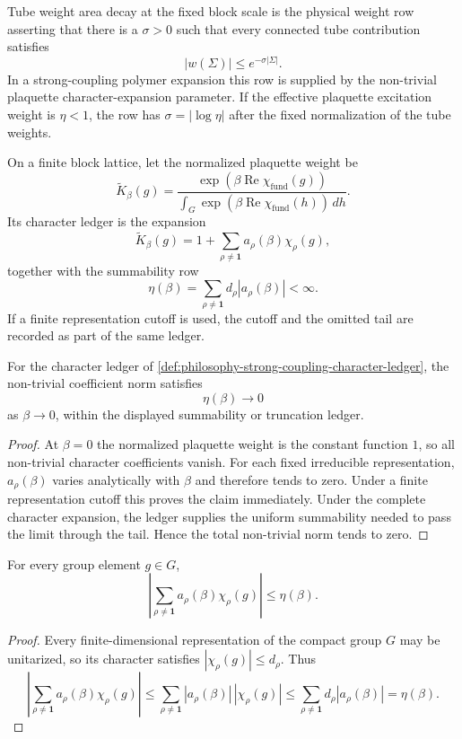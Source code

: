 \begin{definition}
\label{def:philosophy-tube-weight-area-decay}
Tube weight area decay at the fixed block scale is the physical weight
row asserting that there is a $\sigma>0$ such that every connected
tube contribution satisfies
$$
|w(\Sigma)|\le e^{-\sigma|\Sigma|}.
$$
In a strong-coupling polymer expansion this row is supplied by the
non-trivial plaquette character-expansion parameter. If the effective
plaquette excitation weight is $\eta<1$, the row has
$\sigma=|\log\eta|$ after the fixed normalization of the tube weights.
\end{definition}

\begin{definition}
\label{def:philosophy-strong-coupling-character-ledger}
On a finite block lattice, let the normalized plaquette weight be
$$
\widetilde K_{\beta}(g)
=
\frac{\exp(\beta\operatorname{Re}\chi_{\mathrm{fund}}(g))}
{\int_G\exp(\beta\operatorname{Re}\chi_{\mathrm{fund}}(h))\,dh}.
$$
Its character ledger is the expansion
$$
\widetilde K_{\beta}(g)=
1+\sum_{\rho\ne\mathbf 1}a_{\rho}(\beta)\chi_{\rho}(g),
$$
together with the summability row
$$
\eta(\beta)=
\sum_{\rho\ne\mathbf 1}d_{\rho}|a_{\rho}(\beta)|<\infty.
$$
If a finite representation cutoff is used, the cutoff and the omitted
tail are recorded as part of the same ledger.
\end{definition}

\begin{lemma}
\label{lem:philosophy-strong-coupling-small-parameter}
For the character ledger of
\autoref{def:philosophy-strong-coupling-character-ledger}, the
non-trivial coefficient norm satisfies
$$
\eta(\beta)\to0
$$
as $\beta\to0$, within the displayed summability or truncation ledger.
\end{lemma}
\begin{proof}
At $\beta=0$ the normalized plaquette weight is the constant function
$1$, so all non-trivial character coefficients vanish. For each fixed
irreducible representation, $a_{\rho}(\beta)$ varies analytically with
$\beta$ and therefore tends to zero. Under a finite representation cutoff
this proves the claim immediately. Under the complete character expansion,
the ledger supplies the uniform summability needed to pass the limit through
the tail. Hence the total non-trivial norm tends to zero.
\end{proof}

\begin{lemma}
\label{lem:philosophy-single-plaquette-excitation-bound}
For every group element $g\in G$,
$$
\left|
\sum_{\rho\ne\mathbf 1}a_{\rho}(\beta)\chi_{\rho}(g)
\right|
\le
\eta(\beta).
$$
\end{lemma}
\begin{proof}
Every finite-dimensional representation of the compact group $G$ may be
unitarized, so its character satisfies $|\chi_{\rho}(g)|\le d_{\rho}$. Thus
$$
\left|
\sum_{\rho\ne\mathbf 1}a_{\rho}(\beta)\chi_{\rho}(g)
\right|
\le
\sum_{\rho\ne\mathbf 1}|a_{\rho}(\beta)|\,|\chi_{\rho}(g)|
\le
\sum_{\rho\ne\mathbf 1}d_{\rho}|a_{\rho}(\beta)|
=\eta(\beta).
$$
\end{proof}

